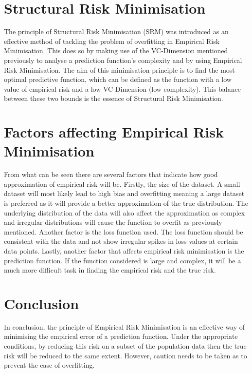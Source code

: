 \section{Structural Risk Minimisation}
The principle of Structural Risk Minimisation (SRM) was introduced as an effective method of tackling the problem of overfitting in Empirical Risk Minimisation. This does so by making use of the VC-Dimension mentioned previously to analyse a prediction function's complexity and by using Empirical Risk Minimisation. The aim of this minimisation principle is to find the most optimal predictive function, which can be defined as the function with a low value of empirical risk and a low VC-Dimension (low complexity). This balance between these two bounds is the essence of Structural Risk Minimisation.

\section{Factors affecting Empirical Risk Minimisation}

From what can be seen there are several factors that indicate how good approximation of empirical risk will be. Firstly, the size of the dataset. A small dataset will most likely lead to high bias and overfitting meaning a large dataset is preferred as it will provide a better approximation of the true distribution. The underlying distribution of the data will also affect the approximation as complex and irregular distributions will cause the function to overfit as previously mentioned. Another factor is the loss function used. The loss function should be consistent with the data and not show irregular spikes in loss values at certain data points. Lastly, another factor that affects empirical risk minimisation is the prediction function. If the function considered is large and complex, it will be a much more difficult task in finding the empirical risk and the true risk. 

\section{Conclusion}
In conclusion, the principle of Empirical Risk Minimisation is an effective way of minimising the empirical error of a prediction function. Under the appropriate conditions, by reducing this risk on a subset of the population data then the true risk will be reduced to the same extent. However, caution needs to be taken as to prevent the case of overfitting.


